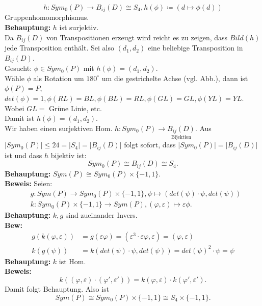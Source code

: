 \begin{problem*}[3]
\begin{equation*}
	h: Sym_0(P) \to B_{ ij }(D) \cong S_4, h(\phi) \coloneqq (d \mapsto \phi(d))
\end{equation*}
Gruppenhomomorphismus.\\
\textbf{Behauptung:} $ h $ ist surjektiv.\\
Da $ B_{ ij }(D)  $ von Transpositionen erzeugt wird reicht es zu zeigen, dass $ Bild(h) $ jede Transposition enthält. Sei also $ (d_1,d_2) $ eine beliebige Transposition in $ B_{ ij }(D)$.\\
Gesucht: $\phi \in Sym_0(P)$ mit $h(\phi) = (d_1,d_2).$\\
Wähle $ \phi $ als Rotation um $ 180^{ \circ } $ um die gestrichelte Achse (vgl. Abb.), dann ist $\phi(P) = P$, $det(\phi) = 1, \phi(RL) = BL, \phi(BL) = RL, \phi(GL) = GL, \phi(YL) = YL$. Wobei $ GL =$ Grüne Linie, etc.\\ 
Damit ist $h(\phi) = (d_1, d_2).$\\
Wir haben einen surjektiven Hom. $h: Sym_0(P) \to \underset{ \text{Bijektion} }{B_{ij}(D)} $. Aus $ \vert Sym_0(P) \vert \leq 24 = \vert S_4 \vert = \vert B_{ ij }(D) \vert$ folgt sofort, dass $\vert Sym_0(P) \vert = \vert B_{ ij }(D) \vert$ ist und dass $ h $ bijektiv ist:
\begin{equation*}
	Sym_0(P) \cong B_{ ij }(D) \cong S_4.
\end{equation*}
\textbf{Behauptung:} $Sym(P) \cong Sym_0(P) \times \{ -1, 1 \}.$\\
\textbf{Beweis:} Seien:
\begin{align*}
	&g: Sym(P) \to Sym_0(P) \times \{ -1, 1 \}, \psi \mapsto (det(\psi) \cdot \psi,det(\psi)) \\
	&k: Sym_0(P) \times \{ -1, 1 \} \to Sym(P), (\varphi, \varepsilon) \mapsto \varepsilon \phi.
\end{align*}
\textbf{Behauptung:} $ k,g $ sind zueinander Invers.\\
\textbf{Bew:} 
\begin{align*}
	g(k(\varphi,\varepsilon)) &= g(\varepsilon \varphi) = (\varepsilon^3 \cdot \varepsilon \varphi, \varepsilon) = (\varphi, \varepsilon) 
	\\
	k(g(\psi)) &= k(det(\psi) \cdot \psi, det(\psi) ) = det(\psi)^2 \cdot \psi = \psi
\end{align*}
\textbf{Behauptung:} $ k $ ist Hom.\\
\textbf{Beweis:} 
\begin{equation*}
	k((\varphi, \varepsilon)\cdot (\varphi', \varepsilon')) = k(\varphi, \varepsilon) \cdot k(\varphi',\varepsilon').
\end{equation*}
Damit folgt Behauptung. Also ist 
\begin{equation*}
	Sym(P) \cong Sym_0(P) \times \{ -1, 1 \} \cong S_4 \times \{ -1, 1 \}.
\end{equation*}
\end{problem*}

